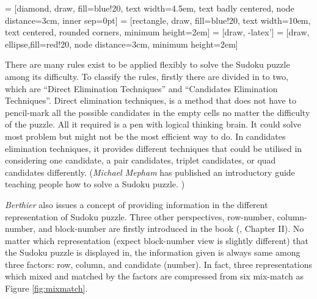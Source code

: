 \documentclass[11pt]{report}
\begin{document}
 = [diamond, draw, fill=blue!20, 
    text width=4.5em, text badly centered, node distance=3cm, inner sep=0pt]
 = [rectangle, draw, fill=blue!20, 
    text width=10em, text centered, rounded corners, minimum height=2em]
 = [draw, -latex']
 = [draw, ellipse,fill=red!20, node distance=3cm,
    minimum height=2em]
    


There are many rules exist to be applied flexibly to solve the Sudoku puzzle among its difficulty. To classify the rules, firstly there are divided in to two, which are ``Direct Elimination Techniques'' and ``Candidates Elimination Techniques''. Direct elimination techniques, is a method that does not have to pencil-mark all the possible candidates in the empty cells no matter the difficulty of the puzzle. All it required is a pen with logical thinking brain. It could solve most problem but might not be the most efficient way to do. In candidates elimination techniques, it provides different techniques that could be utilised in considering one candidate, a pair candidates, triplet candidates, or quad candidates differently. (\emph{Michael Mepham} has published an introductory guide teaching people how to solve a Sudoku puzzle. \cite{Mepham2005Solving})

\emph{Berthier} also issues a concept of providing information in the different representation of Sudoku puzzle. Three other perspectives, row-number, column-number, and block-number are firstly introduced in the book (\cite{Berthier2007Sudoku}, Chapter II). No matter which representation (expect block-number view is slightly different) that the Sudoku puzzle is displayed in, the information given is always same among three factors: row, column, and candidate (number). In fact, three representations which mixed and matched by the factors are compressed from six mix-match as Figure \ref{fig:mixmatch}.
\end{document}
